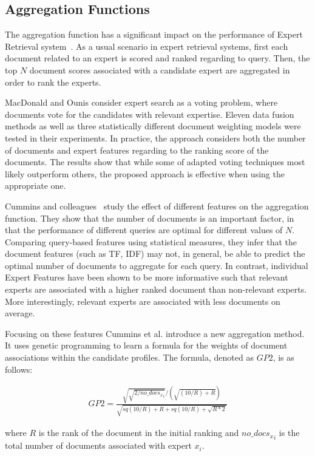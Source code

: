 \subsection{Aggregation Functions}
The aggregation function has a significant impact on the performance of Expert Retrieval system~\cite{agg-gp2}. As a usual scenario in expert retrieval systems, first each document related to an expert is scored and ranked regarding to query. Then, the top $N$ document scores associated with a candidate expert are aggregated in order to rank the experts. 

MacDonald and Ounis \cite{agg-vote} consider expert search as a voting problem, where documents vote for the candidates with relevant expertise. Eleven data fusion methods as well as three statistically different document weighting models were tested in their experiments. In practice, the approach considers both the number of documents and expert features regarding to the ranking score of the documents. The results show that while some of adapted voting techniques most likely outperform others, the proposed approach is effective when using the appropriate one.

Cummins and colleagues~\cite{agg-gp2}  study the effect of different features on the aggregation function. They show that the number of documents is an important factor, in that the performance of different queries are optimal for different values of $N$. Comparing query-based features using statistical measures, they infer that the document features (such as TF, IDF) may not, in general, be able to predict the optimal number of documents to aggregate for each query. In contrast, individual Expert Features have been shown to be more informative such that relevant experts are associated with a higher ranked document than non-relevant experts. More interestingly, relevant experts are associated with less documents on average.

Focusing on these features Cummins et al. \cite{agg-gp2} introduce a new aggregation method. It uses genetic programming to learn a formula for the weights of document associations within the candidate profiles. The formula, denoted as $GP2$, is as follows:

\begin{align*}
GP2 = \frac{\sqrt{\sqrt{2/{no\_docs_x}_i}}/(\sqrt{(10/R)+R})}{\sqrt{sq(10/R)+R+sq(10/R)+\sqrt{R*2}}}
\end{align*}

\noindent 
where $R$ is the rank of the document in the initial ranking and ${no\_docs_x}_i$ is the total number of documents associated with expert $x_i$.

